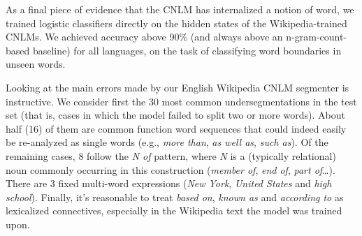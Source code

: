 
As a final piece of evidence that the CNLM has internalized a notion
of word, we trained logistic classifiers directly on the hidden states
of the Wikipedia-trained CNLMs. We achieved accuracy above 90\% (and
always above an n-gram-count-based baseline) for all languages, on the
task of classifying word boundaries in unseen words.


Looking at the main errors made by our English Wikipedia CNLM
segmenter is instructive. We consider first the 30 most common
undersegmentations in the test set (that is, cases in which the model
failed to split two or more words). About half (16) of them are common
function word sequences that could indeed easily be re-analyzed as
single words (e.g., \emph{more than}, \emph{as well as}, \emph{such
  as}). Of the remaining cases, 8 follow the \emph{N of} pattern,
where \emph{N} is a (typically relational) noun commonly occurring in
this construction (\emph{member of}, \emph{end of}, \emph{part
  of}\ldots). There are 3 fixed multi-word expressions (\emph{New
  York}, \emph{United States} and \emph{high school}). Finally, it's
reasonable to treat \emph{based on}, \emph{known as} and
\emph{according to} as lexicalized connectives, especially in the
Wikipedia text the model was trained upon.


